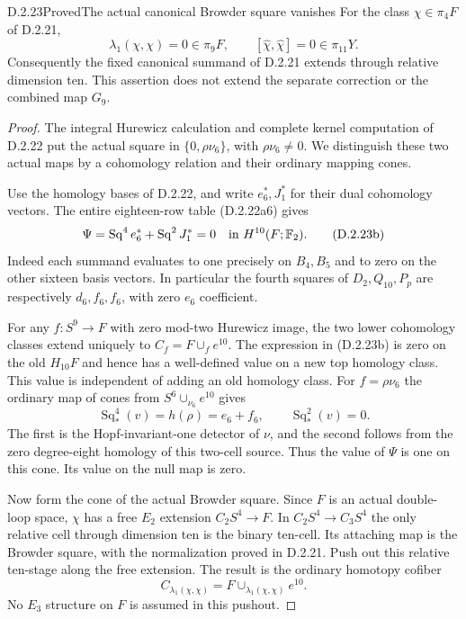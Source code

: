 \begin{claim}{D.2.23}{Proved}{The actual canonical Browder square vanishes}
For the class $\chi\in\pi_4F$ of \textup{D.2.21},
\[
 \lambda_1(\chi,\chi)=0\in\pi_9F,
 \qquad [\widehat\chi,\widehat\chi]=0\in\pi_{11}Y.
 \tag{D.2.23a}
\]
Consequently the fixed canonical summand of \textup{D.2.21}
extends through relative dimension ten. This assertion does not
extend the separate correction or the combined map $G_9$.
\end{claim}
\begin{proof}
The integral Hurewicz calculation and complete kernel computation
of \textup{D.2.22} put the actual square in
$\{0,\rho\nu_6\}$, with $\rho\nu_6\ne0$.
We distinguish these two actual maps by a cohomology relation
and their ordinary mapping cones.

Use the homology bases of \textup{D.2.22}, and write
$e_6^*,J_1^*$ for their dual cohomology vectors. The entire
eighteen-row table \textup{(D.2.22a6)} gives
\[
 \Psi=\operatorname{Sq}^4e_6^*
              +\operatorname{Sq}^2J_1^*=0
                 \quad\text{in }H^{10}(F;\mathbb F_2).
 \tag{D.2.23b}
\]
Indeed each summand evaluates to one precisely on $B_4,B_5$
and to zero on the other sixteen basis vectors. In particular
the fourth squares of $D_2,Q_{10},P_p$ are respectively
$d_6,f_6,f_6$, with zero $e_6$ coefficient.

For any $f:S^9\to F$ with zero mod-two Hurewicz image,
the two lower cohomology classes extend uniquely to
$C_f=F\cup_f e^{10}$. The expression in
\textup{(D.2.23b)} is zero on the old $H_{10}F$ and hence
has a well-defined value on a new top homology class.
This value is independent of adding an old homology class.
For $f=\rho\nu_6$ the ordinary map of cones from
$S^6\cup_{\nu_6}e^{10}$ gives
\[
 \operatorname{Sq}_*^4(v)=h(\rho)=e_6+f_6,
 \qquad \operatorname{Sq}_*^2(v)=0.
 \tag{D.2.23c}
\]
The first is the Hopf-invariant-one detector of $\nu$,
and the second follows from the zero degree-eight homology
of this two-cell source. Thus the value of $\Psi$ is one
on this cone. Its value on the null map is zero.

Now form the cone of the actual Browder square. Since $F$ is
an actual double-loop space, $\chi$ has a free $E_2$ extension
$C_2S^4\to F$. In $C_2S^4\to C_3S^4$ the only relative
cell through dimension ten is the binary ten-cell. Its
attaching map is the Browder square, with the normalization
proved in \textup{D.2.21}. Push out this relative ten-stage
along the free extension. The result is the ordinary
homotopy cofiber
\[
 C_{\lambda_1(\chi,\chi)}=F\cup_{\lambda_1(\chi,\chi)}e^{10}.
 \tag{D.2.23d}
\]
No $E_3$ structure on $F$ is assumed in this pushout.


\end{proof}
